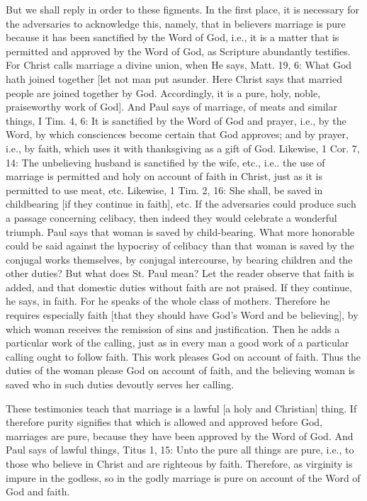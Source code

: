 But we shall reply in order to these figments.  In the first place,
it is necessary for the adversaries to acknowledge this, namely, that
in believers marriage is pure because it has been sanctified by the
Word of God, i.e., it is a matter that is permitted and approved by
the Word of God, as Scripture abundantly testifies.  For Christ calls
marriage a divine union, when He says, Matt. 19, 6: What God hath
joined together [let not man put asunder.  Here Christ says that
married people are joined together by God.  Accordingly, it is a pure,
holy, noble, praiseworthy work of God].  And Paul says of marriage,
of meats and similar things, I Tim. 4, 6: It is sanctified by the
Word of God and prayer, i.e., by the Word, by which consciences
become certain that God approves; and by prayer, i.e., by faith,
which uses it with thanksgiving as a gift of God.  Likewise, 1 Cor. 7,
14: The unbelieving husband is sanctified by the wife, etc., i.e..
the use of marriage is permitted and holy on account of faith in
Christ, just as it is permitted to use meat, etc. Likewise, 1 Tim. 2,
16: She shall, be saved in childbearing [if they continue in faith],
etc. If the adversaries could produce such a passage concerning
celibacy, then indeed they would celebrate a wonderful triumph.  Paul
says that woman is saved by child-bearing.  What more honorable could
be said against the hypocrisy of celibacy than that woman is saved by
the conjugal works themselves, by conjugal intercourse, by bearing
children and the other duties?  But what does St. Paul mean?  Let the
reader observe that faith is added, and that domestic duties without
faith are not praised.  If they continue, he says, in faith.  For he
speaks of the whole class of mothers.  Therefore he requires
especially faith [that they should have God's Word and be believing],
by which woman receives the remission of sins and justification.
Then he adds a particular work of the calling, just as in every man a
good work of a particular calling ought to follow faith.  This work
pleases God on account of faith.  Thus the duties of the woman please
God on account of faith, and the believing woman is saved who in such
duties devoutly serves her calling.

These testimonies teach that marriage is a lawful [a holy and
Christian] thing.  If therefore purity signifies that which is
allowed and approved before God, marriages are pure, because they
have been approved by the Word of God.  And Paul says of lawful
things, Titus 1, 15: Unto the pure all things are pure, i.e., to
those who believe in Christ and are righteous by faith.  Therefore,
as virginity is impure in the godless, so in the godly marriage is
pure on account of the Word of God and faith.

